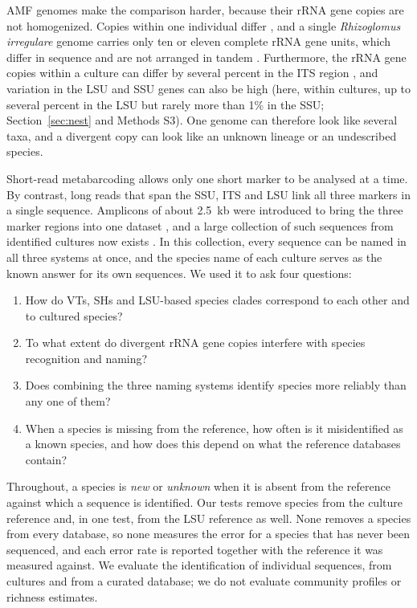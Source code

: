 \documentclass[11pt]{article}
\newcommand{\spn}[1]{\emph{#1}}   %
\begin{document}
AMF genomes make the comparison harder, because their rRNA gene copies are not homogenized. Copies within one
individual differ \cite{pawlowska2004organization}, and a single \spn{Rhizoglomus irregulare} genome carries only
ten or eleven complete rRNA gene units, which differ in sequence and are not arranged in tandem
\cite{maeda2018rdna}. Furthermore, the rRNA gene copies within a culture can differ by several percent in the ITS
region \cite{vankuren2013rdna,stefani2025rdna}, and variation in the LSU and SSU genes can also be high (here,
within cultures, up to several percent in the LSU but rarely more than 1\% in the SSU; Section~\ref{sec:nest} and
Methods S3). One genome can therefore look
like several taxa, and a divergent copy can look like an unknown lineage or an undescribed species.

Short-read metabarcoding allows only one short marker to be analysed at a time. By contrast, long reads that span
the SSU, ITS and LSU link all three markers in a single sequence. Amplicons of about 2.5~kb were introduced to bring
the three marker regions into one dataset \cite{kolarikova2021pacbio}, and a large collection of such sequences
from identified cultures now exists \cite{stefani2025rdna}. In this collection, every sequence can be named in all
three systems at once, and the species name of each culture serves as the known answer for its own sequences. We
used it to ask four questions:
\begin{enumerate}
\item How do VTs, SHs and LSU-based species clades correspond to each other and to cultured species?
\item To what extent do divergent rRNA gene copies interfere with species recognition and naming?
\item Does combining the three naming systems identify species more reliably than any one of them?
\item When a species is missing from the reference, how often is it misidentified as a known species, and how does
this depend on what the reference databases contain?
\end{enumerate}

Throughout, a species is \emph{new} or \emph{unknown} when it is absent from the reference against which a
sequence is identified. Our tests remove species from the culture reference and, in one test, from the LSU reference
as well. None removes a species from every database, so none measures the error for a species that has never been
sequenced, and each error rate is reported together with the reference it was measured against. We evaluate the
identification of individual sequences, from cultures and from a curated database; we do not evaluate community
profiles or richness estimates.
\end{document}
